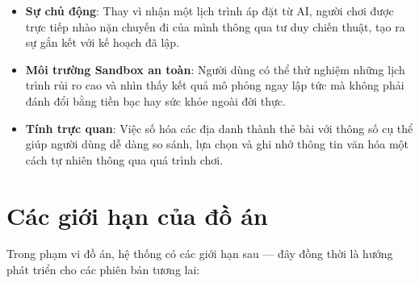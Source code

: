 \begin{itemize}[topsep=0pt, itemsep=2.5pt, leftmargin=1.5cm]
    \item \textbf{Sự chủ động}: Thay vì nhận một lịch trình áp đặt từ AI, người chơi được trực tiếp nhào nặn chuyến đi của mình thông qua tư duy chiến thuật, tạo ra sự gắn kết với kế hoạch đã lập.

    \item \textbf{Môi trường Sandbox an toàn}: Người dùng có thể thử nghiệm những lịch trình rủi ro cao và nhìn thấy kết quả mô phỏng ngay lập tức mà không phải đánh đổi bằng tiền bạc hay sức khỏe ngoài đời thực.

    \item \textbf{Tính trực quan}: Việc số hóa các địa danh thành thẻ bài với thông số cụ thể giúp người dùng dễ dàng so sánh, lựa chọn và ghi nhớ thông tin văn hóa một cách tự nhiên thông qua quá trình chơi.
\end{itemize}

\section{Các giới hạn của đồ án}

Trong phạm vi đồ án, hệ thống có các giới hạn sau — đây đồng thời là hướng phát triển cho các phiên bản tương lai:

